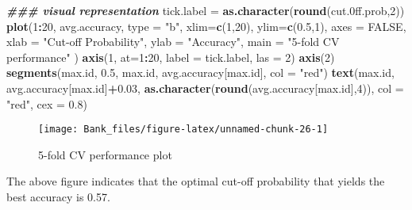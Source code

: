 \documentclass[
]{article}
\newenvironment{Shaded}{\begin{snugshade}}{\end{snugshade}}
\newcommand{\AttributeTok}[1]{\textcolor[rgb]{0.13,0.29,0.53}{#1}}
\newcommand{\ConstantTok}[1]{\textcolor[rgb]{0.56,0.35,0.01}{#1}}
\newcommand{\DecValTok}[1]{\textcolor[rgb]{0.00,0.00,0.81}{#1}}
\newcommand{\DocumentationTok}[1]{\textcolor[rgb]{0.56,0.35,0.01}{\textbf{\textit{#1}}}}
\newcommand{\FloatTok}[1]{\textcolor[rgb]{0.00,0.00,0.81}{#1}}
\newcommand{\FunctionTok}[1]{\textcolor[rgb]{0.13,0.29,0.53}{\textbf{#1}}}
\newcommand{\NormalTok}[1]{#1}
\newcommand{\OtherTok}[1]{\textcolor[rgb]{0.56,0.35,0.01}{#1}}
\newcommand{\SpecialCharTok}[1]{\textcolor[rgb]{0.81,0.36,0.00}{\textbf{#1}}}
\newcommand{\StringTok}[1]{\textcolor[rgb]{0.31,0.60,0.02}{#1}}
\begin{document}
\begin{Shaded}
\begin{Highlighting}[]
\DocumentationTok{\#\#\# visual representation}
\NormalTok{tick.label }\OtherTok{=} \FunctionTok{as.character}\NormalTok{(}\FunctionTok{round}\NormalTok{(cut}\FloatTok{.0}\NormalTok{ff.prob,}\DecValTok{2}\NormalTok{))}
\FunctionTok{plot}\NormalTok{(}\DecValTok{1}\SpecialCharTok{:}\DecValTok{20}\NormalTok{, avg.accuracy, }\AttributeTok{type =} \StringTok{"b"}\NormalTok{,}
     \AttributeTok{xlim=}\FunctionTok{c}\NormalTok{(}\DecValTok{1}\NormalTok{,}\DecValTok{20}\NormalTok{), }
     \AttributeTok{ylim=}\FunctionTok{c}\NormalTok{(}\FloatTok{0.5}\NormalTok{,}\DecValTok{1}\NormalTok{), }
     \AttributeTok{axes =} \ConstantTok{FALSE}\NormalTok{,}
     \AttributeTok{xlab =} \StringTok{"Cut{-}off Probability"}\NormalTok{,}
     \AttributeTok{ylab =} \StringTok{"Accuracy"}\NormalTok{,}
     \AttributeTok{main =} \StringTok{"5{-}fold CV performance"}
\NormalTok{     )}
\FunctionTok{axis}\NormalTok{(}\DecValTok{1}\NormalTok{, }\AttributeTok{at=}\DecValTok{1}\SpecialCharTok{:}\DecValTok{20}\NormalTok{, }\AttributeTok{label =}\NormalTok{ tick.label, }\AttributeTok{las =} \DecValTok{2}\NormalTok{)}
\FunctionTok{axis}\NormalTok{(}\DecValTok{2}\NormalTok{)}
\FunctionTok{segments}\NormalTok{(max.id, }\FloatTok{0.5}\NormalTok{, max.id, avg.accuracy[max.id], }\AttributeTok{col =} \StringTok{"red"}\NormalTok{)}
\FunctionTok{text}\NormalTok{(max.id, avg.accuracy[max.id]}\SpecialCharTok{+}\FloatTok{0.03}\NormalTok{, }\FunctionTok{as.character}\NormalTok{(}\FunctionTok{round}\NormalTok{(avg.accuracy[max.id],}\DecValTok{4}\NormalTok{)), }\AttributeTok{col =} \StringTok{"red"}\NormalTok{, }\AttributeTok{cex =} \FloatTok{0.8}\NormalTok{)}
\end{Highlighting}
\end{Shaded}

\begin{figure}

{\centering \texttt{[image: Bank\_files/figure-latex/unnamed-chunk-26-1]} 

}

\caption{5-fold CV performance plot}\label{fig:unnamed-chunk-26}
\end{figure}

The above figure indicates that the optimal cut-off probability that
yields the best accuracy is 0.57.
\end{document}
